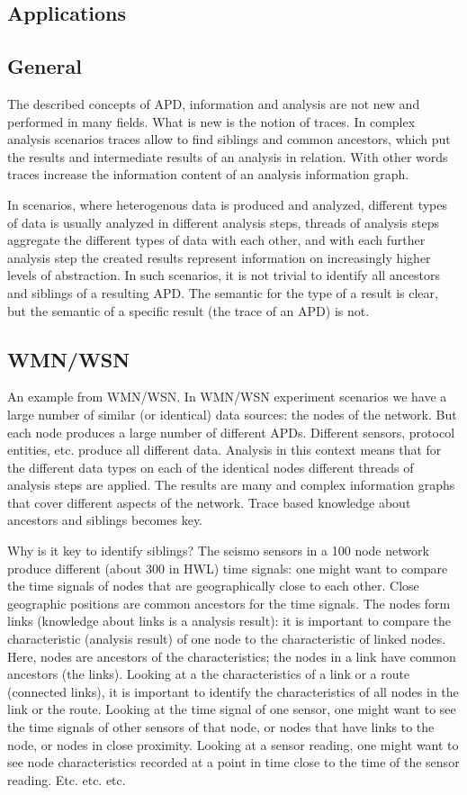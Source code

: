 \subsection{Applications}
\subsection{General}
The described concepts of APD, information and analysis are not new and performed in many fields. What is new is the notion of traces. In complex analysis scenarios traces allow to find siblings and common ancestors, which put the results and intermediate results of an analysis in relation. With other words traces increase the information content of an analysis information graph.

In scenarios, where heterogenous data is produced and analyzed, different types of data is usually analyzed in different analysis steps, threads of analysis steps aggregate the different types of data with each other, and with each further analysis step the created results represent information on increasingly higher levels of abstraction. In such scenarios, it is not trivial to identify all ancestors and siblings of a resulting APD. The semantic for the type of a result is clear, but the semantic of a specific result (the trace of an APD) is not.

\subsection{WMN/WSN}
An example from WMN/WSN. In WMN/WSN experiment scenarios we have a large number of similar (or identical) data sources: the nodes of the network. But each node produces a large number of different APDs. Different sensors, protocol entities, etc. produce all different data. Analysis in this context means that for the different data types on each of the identical nodes different threads of analysis steps are applied. The results are many and complex information graphs that cover different aspects of the network. Trace based knowledge about ancestors and siblings becomes key. 

Why is it key to identify siblings? The seismo sensors in a 100 node network produce different (about 300 in HWL) time signals: one might want to compare the time signals of nodes that are geographically close to each other. Close geographic positions are common ancestors for the time signals. The nodes form links (knowledge about links is a analysis result): it is important to compare the characteristic (analysis result) of one node to the characteristic of linked nodes. Here, nodes are ancestors of the characteristics; the nodes in a link have common ancestors (the links). Looking at a the characteristics of a link or a route (connected links), it is important to identify the characteristics of all nodes in the link or the route. Looking at the time signal of one sensor, one might want to see the time signals of other sensors of that node, or nodes that have links to the node, or nodes in close proximity. Looking at a sensor reading, one might want to see node characteristics recorded at a point in time close to the time of the sensor reading. Etc. etc. etc.


